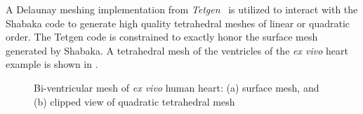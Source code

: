 A Delaunay meshing implementation from \textit{Tetgen}~\cite{tetgen} is utilized to interact with the Shabaka code to generate high quality tetrahedral meshes of linear or quadratic order. The Tetgen code is constrained to exactly honor the surface mesh generated by Shabaka. A tetrahedral mesh of the ventricles of the \textit{ex vivo} heart example is shown in .
\begin{figure}
\centering
{}
%
\caption{Bi-ventricular mesh of \textit{ex vivo} human heart: (a) surface mesh, and (b) clipped view of quadratic tetrahedral mesh}
\label{fig:tetmesh}
\end{figure}

